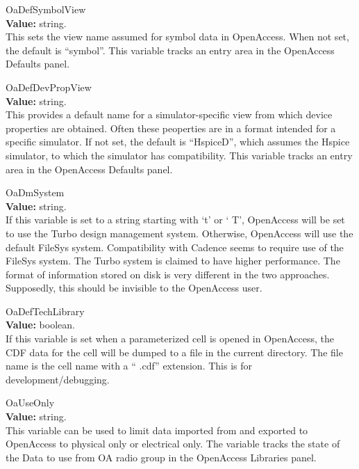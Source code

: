 \begin{description}
\item{\et OaDefSymbolView}\\
{\bf Value:} string.\\
This sets the view name assumed for symbol data in OpenAccess.  When
not set, the default is ``{\vt symbol}''.  This variable tracks an
entry area in the {\cb OpenAccess Defaults} panel.

\item{\et OaDefDevPropView}\\
{\bf Value:} string.\\
This provides a default name for a simulator-specific view from which
device properties are obtained.  Often these peoperties are in a
format intended for a specific simulator.  If not set, the default is
``{\vt HspiceD}'', which assumes the Hspice simulator, to which the
{\WRspice} simulator has compatibility.  This variable tracks an entry
area in the {\cb OpenAccess Defaults} panel.

\item{\et OaDmSystem}\\
{\bf Value:} string.\\
If this variable is set to a string starting with `{\vt t}' or `{\vt
T}', OpenAccess will be set to use the {\et Turbo} design management
system.  Otherwise, OpenAccess will use the default {\et FileSys}
system.  Compatibility with Cadence seems to require use of the {\et
FileSys} system.  The {\et Turbo} system is claimed to have higher
performance.  The format of information stored on disk is very
different in the two approaches.  Supposedly, this should be invisible
to the OpenAccess user.

\item{\et OaDefTechLibrary}\\
{\bf Value:} boolean.\\
If this variable is set when a parameterized cell is opened in
OpenAccess, the CDF data for the cell will be dumped to a file in the
current directory.  The file name is the cell name with a ``{\vt
.cdf}'' extension.  This is for development/debugging.

\item{\et OaUseOnly}\\
{\bf Value:} string.\\
This variable can be used to limit data imported from and exported to
OpenAccess to physical only or electrical only.  The variable tracks
the state of the {\cb Data to use from OA} radio group in the {\cb
OpenAccess Libraries} panel. 


\end{description}
